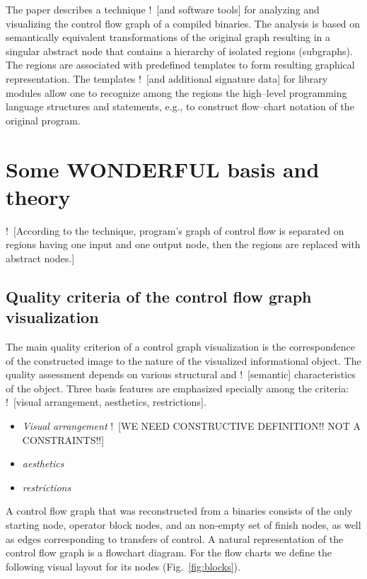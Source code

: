 \documentclass[conference]{IEEEtran}
\newcommand{\nnn}[2][ncolor]{\noindent%
\textcolor{eclr}{!\ [}\textcolor{#1}{#2}\textcolor{eclr}{]}}
\begin{document}
The paper describes a technique \nnn{and software tools} for analyzing and visualizing the control flow graph of a compiled binaries.  The analysis is based on semantically equivalent transformations of the original graph resulting in a singular abstract node that contains a hierarchy of isolated regions (subgraphs).  The regions are associated with predefined templates to form resulting graphical representation.  The templates \nnn{and additional signature data} for library modules allow one to recognize among the regions the high--level programming language structures and statements, e.g., to construct flow--chart notation of the original program.

\section{Some WONDERFUL basis and theory}

\nnn{According to the technique, program's graph of control flow is separated  on regions having one input and one output node, then the regions are replaced with abstract nodes.}

\subsection{Quality criteria of the control flow graph visualization}

The main quality criterion of a control graph visualization is the correspondence of the constructed image to the nature of the visualized informational object.  The quality assessment depends on various structural and \nnn{semantic} characteristics of the object.  Three basis features are emphasized specially among the criteria: \nnn{visual arrangement, aesthetics, restrictions}.
\begin{itemize}
\item \emph{Visual arrangement} \nnn{WE NEED CONSTRUCTIVE DEFINITION!! NOT A CONSTRAINTS!!}
\item \emph{aesthetics}
\item \emph{restrictions}
\end{itemize}

A control flow graph that was reconstructed from a binaries consists of the only starting node, operator block nodes, and an non-empty set of finish nodes, as well as edges corresponding to transfers of control.  A natural representation of the control flow graph is a flowchart diagram.  For the flow charts we define the following visual layout for its nodes (Fig.~\ref{fig:blocks}).
\end{document}
